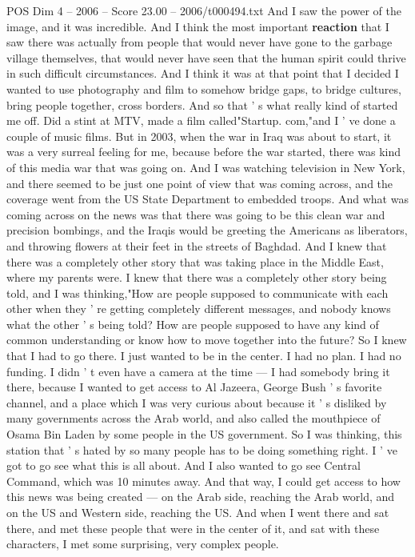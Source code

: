 \begin{textsample}{POS Dim 4 – 2006 – Score 23.00 – 2006/t000494.txt}
And I saw the power of the image, and it was incredible.
And I think the most important \textbf{reaction} that I saw there was actually from people that would never have gone to the garbage village themselves, that would never have seen that the human spirit could thrive in such difficult circumstances.
And I think it was at that point that I decided I wanted to use photography and film to somehow bridge gaps, to bridge cultures, bring people together, cross borders.
And so that ' s what really kind of started me off.
Did a stint at MTV, made a film called"Startup. com,"and I ' ve done a couple of music films.
But in 2003, when the war in Iraq was about to start, it was a very surreal feeling for me, because before the war started, there was kind of this media war that was going on.
And I was watching television in New York, and there seemed to be just one point of view that was coming across, and the coverage went from the US State Department to embedded troops.
And what was coming across on the news was that there was going to be this clean war and precision bombings, and the Iraqis would be greeting the Americans as liberators, and throwing flowers at their feet in the streets of Baghdad.
And I knew that there was a completely other story that was taking place in the Middle East, where my parents were.
I knew that there was a completely other story being told, and I was thinking,"How are people supposed to communicate with each other when they ' re getting completely different messages, and nobody knows what the other ' s being told?
How are people supposed to have any kind of common understanding or know how to move together into the future?
So I knew that I had to go there.
I just wanted to be in the center.
I had no plan.
I had no funding.
I didn ' t even have a camera at the time — I had somebody bring it there, because I wanted to get access to Al Jazeera, George Bush ' s favorite channel, and a place which I was very curious about because it ' s disliked by many governments across the Arab world, and also called the mouthpiece of Osama Bin Laden by some people in the US government.
So I was thinking, this station that ' s hated by so many people has to be doing something right.
I ' ve got to go see what this is all about.
And I also wanted to go see Central Command, which was 10 minutes away.
And that way, I could get access to how this news was being created — on the Arab side, reaching the Arab world, and on the US and Western side, reaching the US.
And when I went there and sat there, and met these people that were in the center of it, and sat with these characters, I met some surprising, very complex people.

\end{textsample}
